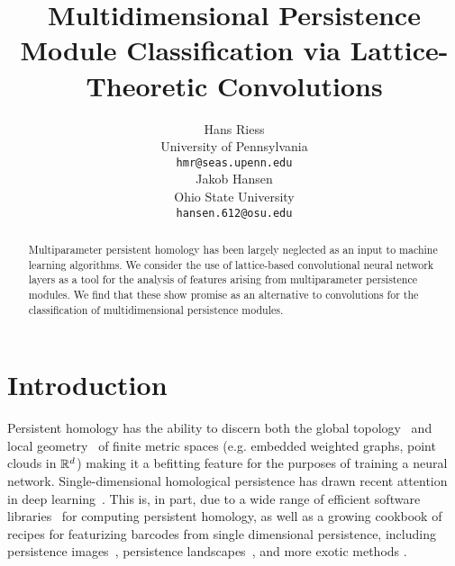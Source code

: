 \documentclass{article}
\title{Multidimensional Persistence Module Classification via Lattice-Theoretic Convolutions}
\author{%
  Hans Riess \\
  University of Pennsylvania\\
  \texttt{hmr@seas.upenn.edu} \\
  \And
  Jakob Hansen \\
  Ohio State University \\
  \texttt{hansen.612@osu.edu}
}
\begin{document}
\maketitle

\begin{abstract}
 Multiparameter persistent homology has been largely neglected as an input to
 machine learning algorithms.
 We consider the use of lattice-based convolutional neural network layers as a 
 tool for the analysis of features arising from multiparameter persistence
 modules. We find that these show promise as an alternative to convolutions for
 the classification of multidimensional persistence modules.
\end{abstract}

\section{Introduction}

Persistent homology has the ability to discern both the global
topology~\cite{ghrist_barcodes:_2008} and local
geometry~\cite{bubenik_persistent_2020} of finite metric spaces (e.g. embedded
weighted graphs, point clouds in $\mathbb{R}^d$) making it a befitting feature for the
purposes of training a neural network. Single-dimensional homological
persistence has drawn recent attention in deep learning~\cite{hofer_deep_2017,
pun_persistent-homology-based_2018, bruel-gabrielsson_topology_2020}. This is,
in part, due to a wide range of efficient software
libraries~\cite{otter_roadmap_2017, henselman_matroid_2017, bauer_ripser:_2019}
for computing persistent homology, %
as well as a growing cookbook of recipes 
for featurizing barcodes from single dimensional persistence, including
persistence images~\cite{adams_persistence_2017}, persistence
landscapes~\cite{bubenik_statistical_2015}, and more exotic methods
\cite{kalisnik_tropical_2019}.
\end{document}
